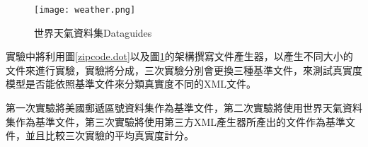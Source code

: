 \begin{figure}[H]
\centering
\graphicspath{{/Users/FUDA/Documents/masterThesis/image/}}
\texttt{[image: weather.png]}
\caption{世界天氣資料集Dataguides}
\label{weather.dot}
\end{figure}

實驗中將利用圖\ref{zipcode.dot}以及圖\ref{weather.dot}的架構撰寫文件產生器，以產生不同大小的文件來進行實驗，實驗將分成，三次實驗分別會更換三種基準文件，來測試真實度模型是否能依照基準文件來分類真實度不同的XML文件。\\\par
第一次實驗將美國郵遞區號資料集作為基準文件，第二次實驗將使用世界天氣資料集作為基準文件，第三次實驗將使用第三方XML產生器所產出的文件作為基準文件，並且比較三次實驗的平均真實度計分。\\\par

